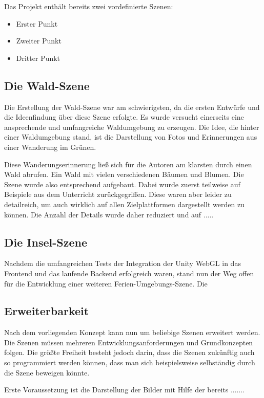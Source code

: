 Das Projekt enthält bereits zwei vordefinierte Szenen:

\begin{itemize}
    \item Erster Punkt
    \item Zweiter Punkt
    \item Dritter Punkt
\end{itemize}


\subsection{Die Wald-Szene}

Die Erstellung der Wald-Szene war am schwierigsten, da die ersten Entwürfe und die Ideenfindung über diese Szene erfolgte. Es wurde versucht einerseits eine ansprechende und umfangreiche Waldumgebung zu erzeugen. Die Idee, die hinter einer Waldumgebung stand, ist die Darstellung von Fotos und Erinnerungen aus einer Wanderung im Grünen.

Diese Wanderungserinnerung ließ sich für die Autoren am klarsten durch einen Wald abrufen. Ein Wald mit vielen verschiedenen Bäumen und Blumen. Die Szene wurde also entsprechend aufgebaut. Dabei wurde zuerst teilweise auf Beispiele aus dem Unterricht zurückgegriffen. Diese waren aber leider zu detailreich, um auch wirklich auf allen Zielplattformen dargestellt werden zu können. Die Anzahl der Details wurde daher reduziert und auf  .....


\subsection{Die Insel-Szene}

Nachdem die umfangreichen Tests der Integration der Unity WebGL in das Frontend und das laufende Backend erfolgreich waren, stand nun der Weg offen für die Entwicklung einer weiteren Ferien-Umgebungs-Szene. Die   

\subsection{Erweiterbarkeit}
\label{subsec:unity-erweiterbarkeit}

Nach dem vorliegenden Konzept kann nun um beliebige Szenen erweitert werden. Die Szenen müssen mehreren Entwicklungsanforderungen und Grundkonzepten folgen. Die größte Freiheit besteht jedoch darin, dass die Szenen zukünftig auch so programmiert werden können, dass man sich beispielsweise selbständig durch die Szene beweigen könnte.

Erste Voraussetzung ist die Darstellung der Bilder mit Hilfe der bereits .......


